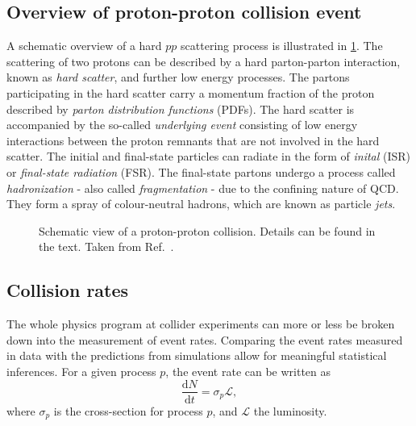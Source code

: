 
\subsection{Overview of proton-proton collision event}
\label{subsec:pp-collision-overview}
A schematic overview of a hard $pp$ scattering process is illustrated in \cref{fig:ppcol}.
The scattering of two protons can be described by a hard parton-parton interaction, known as \emph{hard scatter}, and further low energy processes.
The partons participating in the hard scatter carry a momentum fraction of the proton described by \emph{parton distribution functions} (PDFs).
The hard scatter is accompanied by the so-called \emph{underlying event} consisting of low energy interactions between the proton remnants that are not involved in the hard scatter.
The initial and final-state particles can radiate in the form of \emph{inital} (ISR) or \emph{final-state radiation} (FSR). The final-state partons undergo a process called \emph{hadronization} - also called \emph{fragmentation} - due to the confining nature of QCD. They form a spray of colour-neutral hadrons, which are known as particle \emph{jets}.

\begin{figure}
  \caption[Schematic view of a proton-proton collision.]{Schematic view of a proton-proton collision. Details can be found in the text. Taken from Ref.~\cite{Bhatti2010}. }
  \label{fig:ppcol}
\end{figure}


\subsection{Collision rates}
The whole physics program at collider experiments can more or less be broken down into the measurement of event rates. Comparing the event rates measured in data with the predictions from simulations allow for meaningful statistical inferences.
For a given process $p$, the event rate can be written as
\begin{equation}
  \frac{\mathrm{d}N}{\mathrm{d}t} = \sigma_p \mathcal{L},
\end{equation}
where $\sigma_p$ is the cross-section for process $p$, and $\mathcal{L}$ the luminosity.

